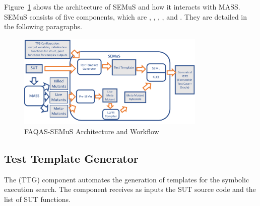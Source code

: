 




Figure~\ref{fig:semus_architecture} shows the architecture of SEMuS and how it interacts with MASS. SEMuS consists of five components, which are ,  ,  ,  , and .
They are detailed in the following paragraphs.

\begin{figure}[h]
\begin{center}
\includegraphics[width=0.8\textwidth]{images/semus-architecture2}
\caption{FAQAS-SEMuS Architecture and Workflow}
\label{fig:semus_architecture}
\end{center}
\end{figure}


\subsection{Test Template Generator}

The  (TTG) component automates the generation of templates for the symbolic execution search. The component receives as inputs the SUT source code and the list of SUT functions.

